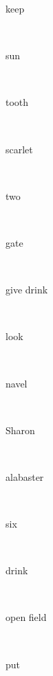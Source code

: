 \documentclass[a4paper]{article}
\begin{document}
\begin{multicols}{4}
\begin{multicols}{4}
\begin{multicols}{5}
{\hebrewfont{}} \begin{english}keep\end{english}\\
{\hebrewfont{}} \begin{english}sun\end{english}\\
{\hebrewfont{}} \begin{english}tooth\end{english}\\
{\hebrewfont{}} \begin{english}scarlet\end{english}\\
{\hebrewfont{}} \begin{english}two\end{english}\\
{\hebrewfont{}} \begin{english}gate\end{english}\\
{\hebrewfont{}} \begin{english}give drink\end{english}\\
{\hebrewfont{}} \begin{english}look\end{english}\\
{\hebrewfont{}} \begin{english}navel\end{english}\\
{\hebrewfont{}} \begin{english}Sharon\end{english}\\
{\hebrewfont{}} \begin{english}alabaster\end{english}\\
{\hebrewfont{}} \begin{english}six\end{english}\\
{\hebrewfont{}} \begin{english}drink\end{english}\\
{\hebrewfont{}} \begin{english}open field\end{english}\\
{\hebrewfont{}} \begin{english}put\end{english}\\

\end{multicols}
\end{multicols}
\end{multicols}
\end{document}
